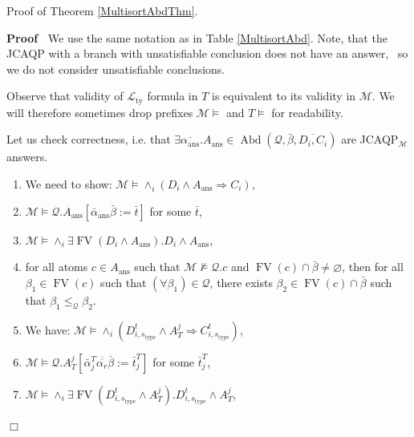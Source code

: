 \documentclass{article}
\newcommand{\assign}{:=}
\newcommand{\tmop}[1]{\ensuremath{\operatorname{#1}}}
\newcommand{\tmrsub}[1]{\ensuremath{_{\textrm{#1}}}}
\newenvironment{proof}{\noindent\textbf{Proof\ }}{\hspace*{\fill}$\Box$\medskip}
\begin{document}
Proof of Theorem \ref{MultisortAbdThm}.

\begin{proof}
  We use the same notation as in Table \ref{MultisortAbd}. Note, that the
  JCAQP with a branch with unsatisfiable conclusion does not have an answer, \
  so we do not consider unsatisfiable conclusions.
  
  Observe that validity of $\mathcal{L}_{\tmop{ty}}$ formula in $T$ is
  equivalent to its validity in $\mathcal{M}$. We will therefore sometimes
  drop prefixes $\mathcal{M} \vDash$ and $T \vDash$ for readability.
  
  Let us check correctness, i.e. that $\exists \overline{\alpha_{\tmop{ans}}}
  .A_{\tmop{ans}} \in \tmop{Abd} (\mathcal{Q}, \bar{\beta}, \overline{D_i,
  C_i})$ are JCAQP\tmrsub{$\mathcal{M}$} answers.
  \begin{enumerate}
    \item We need to show: $\mathcal{M} \vDash \wedge_i (D_i \wedge
    A_{\tmop{ans}} \Rightarrow C_i)$,
    
    \item $\mathcal{M} \vDash \mathcal{Q}.A_{\tmop{ans}}
    [\bar{\alpha}_{\tmop{ans}} \bar{\beta} \assign \bar{t}]$ for some
    $\bar{t}$,
    
    \item $\mathcal{M} \vDash \wedge_i \exists \tmop{FV} (D_i \wedge
    A_{\tmop{ans}}) .D_i \wedge A_{\tmop{ans}}$,
    
    \item for all atoms $c \in A_{\tmop{ans}}$ such that $\mathcal{M} \nvDash
    \mathcal{Q}.c$ and $\tmop{FV} (c) \cap \bar{\beta} \neq \varnothing$, then
    for all $\beta_1 \in \tmop{FV} (c)$ such that $(\forall \beta_1) \in
    \mathcal{Q}$, there exists $\beta_2 \in \tmop{FV} (c) \cap \bar{\beta}$
    such that $\beta_1 \leqslant_{\mathcal{Q}} \beta_2$.
    
    \item We have: $\mathcal{M} \vDash \wedge_i (D_{i, s_{\tmop{type}}}^t
    \wedge A_T^j \Rightarrow C_{i, s_{\tmop{type}}}^t)$,
    
    \item $\mathcal{M} \vDash \mathcal{Q}.A_T^j \left[ \bar{\alpha}_j^T
    \overline{\overline{\alpha_r}} \bar{\beta} \assign \bar{t}_j^T \right]$
    for some $\bar{t}_j^T$,
    
    \item $\mathcal{M} \vDash \wedge_i \exists \tmop{FV} (D_{i,
    s_{\tmop{type}}}^t \wedge A_T^j) .D_{i, s_{\tmop{type}}}^t \wedge A_T^j$,
    

\end{enumerate}
\end{proof}
\end{document}

